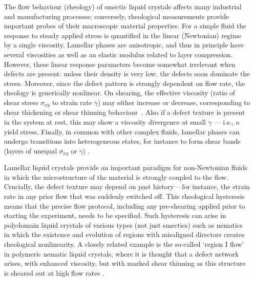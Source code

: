\documentclass[8.5pt,twoside,twocolumn]{article}
\begin{document}
The flow behaviour (rheology) of smectic liquid crystals affects many industrial and manufacturing processes; conversely, rheological measurements provide important probes of their macroscopic material properties.
For a simple fluid the response to steady applied stress is quantified in the linear (Newtonian) regime by a single viscosity. Lamellar phases are anisotropic, and thus in principle have several viscosities as well as an elastic modulus related to layer compression. However, these linear response parameters become somewhat irrelevant when defects are present: unless their density is very low, the defects soon dominate the stress. Moreover, since the defect pattern is strongly dependent on flow rate, the rheology is generically nonlinear. On shearing, the effective viscosity (ratio of shear stress $\sigma_{xy}$  to strain rate $\dot\gamma$) may either increase or decrease, corresponding
to shear thickening or shear thinning behaviour~\cite{Larson}. Also if a defect texture is present in the system at rest, this may show a viscosity divergence at small $\dot \gamma$ --- i.e., a yield stress.
Finally, in common with other complex fluids, lamellar phases can undergo transitions into heterogeneous states, for instance to form shear bands (layers of unequal $\sigma_{xy}$ or $\dot\gamma$) \cite{Olmsted08}. 

Lamellar liquid crystals provide an important paradigm for non-Newtonian fluids in which the microstructure of the material is strongly coupled to the flow. Crucially, the defect texture may depend on past history -- for instance, the strain rate in any prior flow that was suddenly switched off. This rheological hysteresis means that the precise flow protocol, including any pre-shearing applied prior to starting the experiment, needs to be specified. Such hysteresis can arise in polydomain liquid crystals of various types (not just smectics) such as nematics in which the existence and evolution of regions with misaligned directors creates rheological nonlinearity. A closely related example is the so-called `region I flow' in polymeric nematic liquid crystals, where it is thought that a defect network arises, with enhanced viscosity, but with
marked shear thinning as this structure is sheared out at high flow rates \cite{Larson}. 
\end{document}
